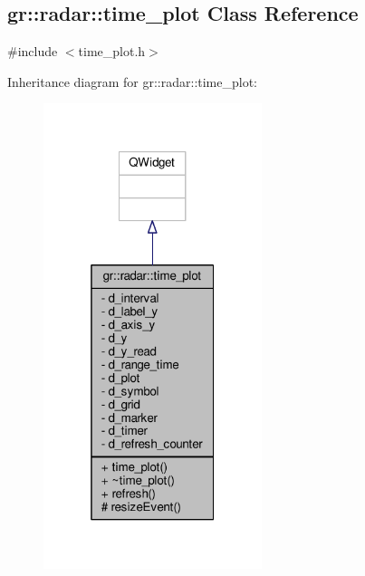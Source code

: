\subsection{gr\+:\+:radar\+:\+:time\+\_\+plot Class Reference}
\label{classgr_1_1radar_1_1time__plot}


{\ttfamily \#include $<$time\+\_\+plot.\+h$>$}



Inheritance diagram for gr\+:\+:radar\+:\+:time\+\_\+plot\+:
\nopagebreak
\begin{figure}[H]
\begin{center}
\leavevmode
\includegraphics[width=181pt]{d9/d23/classgr_1_1radar_1_1time__plot__inherit__graph}
\end{center}
\end{figure}


